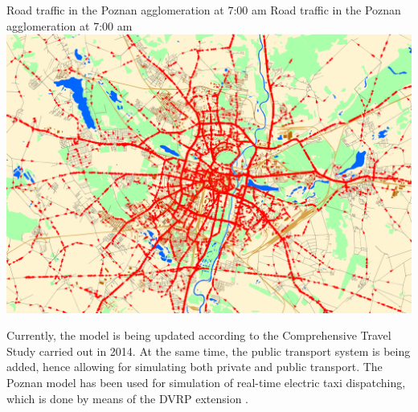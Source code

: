 \createfigure%
{Road traffic in the Poznan agglomeration at 7:00 am}%
{Road traffic in the Poznan agglomeration at 7:00 am}%
{\label{fig:poznan_traffic_simulation}}%
{\includegraphics[width=\textwidth, angle=0]{using/figures/poznan_traffic_simulation}}%
{}%

Currently, the model is being updated according to the Comprehensive Travel Study carried out in 2014. At the same time, the public transport system is being added, hence allowing for simulating both private and public transport. The Poznan model has been used for simulation of real-time electric taxi dispatching, which is done by means of the DVRP extension .

